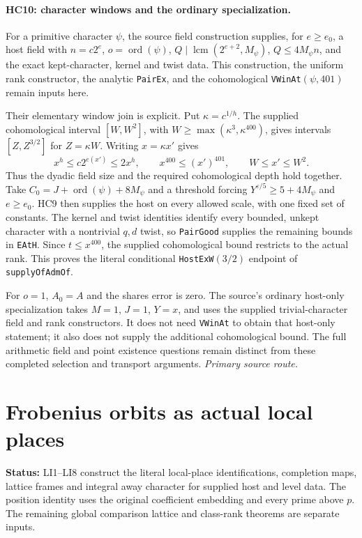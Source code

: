 \documentclass[11pt,a4paper]{article}
\numberwithin{equation}{section}
\theoremstyle{remark}\newtheorem{remark}[theorem]{Remark}
\newcommand{\status}[1]{\textbf{Status:} #1}
\begin{document}
\paragraph{HC10: character windows and the ordinary specialization.}
For a primitive character $\psi$, the source field construction
supplies, for $e\ge e_0$, a host field with
$n=c2^e$, $o=\operatorname{ord}(\psi)$,
$Q\mid\operatorname{lcm}(2^{e+2},M_\psi)$,
$Q\le4M_\psi n$, and the exact kept-character, kernel and twist
data. This construction, the uniform rank constructor, the analytic
\texttt{PairEx}, and the cohomological \texttt{VWinAt}$(\psi,401)$
remain inputs here.

Their elementary window join is explicit. Put $\kappa=c^{1/h}$.
The supplied cohomological interval $[W,W^2]$, with
$W\ge\max(\kappa^3,\kappa^{400})$, gives intervals
$[Z,Z^{3/2}]$ for $Z=\kappa W$. Writing $x=\kappa x'$ gives
\[
 x^h\le c2^{e(x')}\le2x^h,\qquad
 x^{400}\le(x')^{401},\qquad W\le x'\le W^2.        \tag{HC.16}
\]
Thus the dyadic field size and the required cohomological depth
hold together. Take $C_0=J+\operatorname{ord}(\psi)+8M_\psi$ and
a threshold forcing $Y^{\varepsilon/5}\ge5+4M_\psi$ and $e\ge e_0$.
HC9 then supplies the host on every allowed scale, with one fixed
set of constants. The kernel and twist identities identify every
bounded, unkept character with a nontrivial $q,d$ twist, so
\texttt{PairGood} supplies the remaining bounds in \texttt{EAtH}.
Since $t\le x^{400}$, the supplied cohomological bound restricts
to the actual rank. This proves the literal conditional
\texttt{HostExW}$(3/2)$ endpoint of \texttt{supplyOfAdmOf}.

For $o=1$, $A_0=A$ and the shares error is zero. The source's
ordinary host-only specialization takes $M=1$, $J=1$, $Y=x$,
and uses the supplied trivial-character field and rank constructors.
It does not need \texttt{VWinAt} to obtain that host-only statement;
it also does not supply the additional cohomological bound.
The full arithmetic field and point existence questions remain
distinct from these completed selection and transport arguments.
\noindent\textit{Primary source route.}\cite{actual-host-tops}


\section{Frobenius orbits as actual local places}
\label{sec:local-identifications}

\status{LI1--LI8 construct the literal local-place identifications,
completion maps, lattice frames and integral away character for supplied
host and level data. The position identity uses the original coefficient
embedding and every prime above $p$. The remaining global comparison
lattice and class-rank theorems are separate inputs.}
\end{document}
